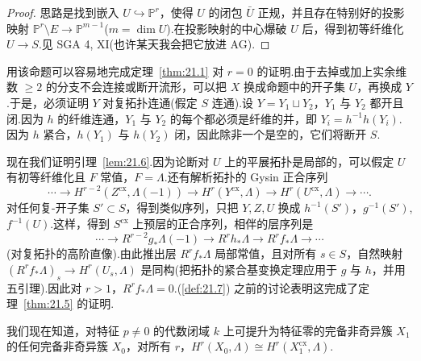 \begin{proof}
思路是找到嵌入 $U \hookrightarrow \mathbb{P}^{r}$，使得 $U$ 的闭包 $\bar{U}$ 正规，并且存在特别好的投影映射 $\mathbb{P}^{r} \setminus E \to \mathbb{P}^{m-1}$($m = \dim U$).在投影映射的中心爆破 $U$ 后，得到初等纤维化 $U \to S$.见 SGA 4, XI(也许某天我会把它放进 AG).
\end{proof}

\begin{remark}\label{rem:21.9}
用该命题可以容易地完成定理~\ref{thm:21.1} 对 $r = 0$ 的证明.由于去掉或加上实余维数 $\geq 2$ 的分支不会连接或断开流形，可以把 $X$ 换成命题中的开子集 $U$，再换成 $Y$.于是，必须证明 $Y$ 对复拓扑连通(假定 $S$ 连通).设 $Y = Y_1 \sqcup Y_2$，$Y_1$ 与 $Y_2$ 都开且闭.因为 $h$ 的纤维连通，$Y_1$ 与 $Y_2$ 的每个都必须是纤维的并，即 $Y_i = h^{-1}h(Y_i)$.因为 $h$ 紧合，$h(Y_1)$ 与 $h(Y_2)$ 闭，因此除非一个是空的，它们将断开 $S$.

现在我们证明引理~\ref{lem:21.6}.因为论断对 $U$ 上的平展拓扑是局部的，可以假定 $U$ 有初等纤维化且 $F$ 常值，$F = \Lambda$.还有解析拓扑的 Gysin 正合序列
\[
\cdots \to H^{r-2}(Z^{\mathrm{cx}}, \Lambda(-1)) \to H^{r}(Y^{\mathrm{cx}}, \Lambda) \to H^{r}(U^{\mathrm{cx}}, \Lambda) \to \cdots.
\]
对任何复-开子集 $S' \subset S$，得到类似序列，只把 $Y, Z, U$ 换成 $h^{-1}(S')$，$g^{-1}(S')$,$f^{-1}(U)$.这样，得到 $S^{\mathrm{cx}}$ 上预层的正合序列，相伴的层序列是
\[
\cdots \to R^{r-2}g_{*}\Lambda(-1) \to R^{r}h_{*}\Lambda \to R^{r}f_{*}\Lambda \to \cdots
\]
(对复拓扑的高阶直像).由此推出层 $R^{r}f_{*}\Lambda$ 局部常值，且对所有 $s \in S$，自然映射 $(R^{r}f_{*}\Lambda)_s \to H^{r}(U_s, \Lambda)$ 是同构(把拓扑的紧合基变换定理应用于 $g$ 与 $h$，并用五引理).因此对 $r > 1$，$R^{r}f_{*}\Lambda = 0$.(\ref{def:21.7}) 之前的讨论表明这完成了定理~\ref{thm:21.5} 的证明.
\end{remark}

\begin{remark}\label{rem:21.10}
我们现在知道，对特征 $p \neq 0$ 的代数闭域 $k$ 上可提升为特征零的完备非奇异簇 $X_1$ 的任何完备非奇异簇 $X_0$，对所有 $r$，$H^{r}(X_0, \Lambda) \cong H^{r}(X^{\mathrm{cx}}_1, \Lambda)$.
\end{remark}
